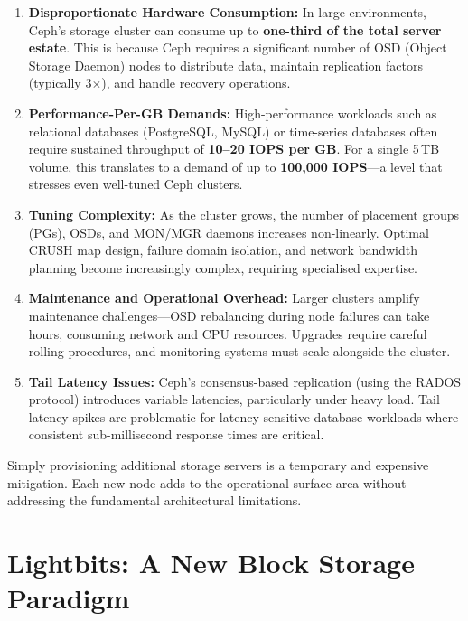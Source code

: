 \documentclass[12pt,a4paper,oneside]{report}
\begin{document}
\begin{enumerate}[label=\arabic*.]
    \item \textbf{Disproportionate Hardware Consumption:} In large environments, Ceph's storage cluster can consume up to \textbf{one-third of the total server estate}. This is because Ceph requires a significant number of OSD (Object Storage Daemon) nodes to distribute data, maintain replication factors (typically 3$\times$), and handle recovery operations.

    \item \textbf{Performance-Per-GB Demands:} High-performance workloads such as relational databases (PostgreSQL, MySQL) or time-series databases often require sustained throughput of \textbf{10–20 IOPS per GB}. For a single 5\,TB volume, this translates to a demand of up to \textbf{100,000 IOPS}—a level that stresses even well-tuned Ceph clusters.

    \item \textbf{Tuning Complexity:} As the cluster grows, the number of placement groups (PGs), OSDs, and MON/MGR daemons increases non-linearly. Optimal CRUSH map design, failure domain isolation, and network bandwidth planning become increasingly complex, requiring specialised expertise.

    \item \textbf{Maintenance and Operational Overhead:} Larger clusters amplify maintenance challenges—OSD rebalancing during node failures can take hours, consuming network and CPU resources. Upgrades require careful rolling procedures, and monitoring systems must scale alongside the cluster.

    \item \textbf{Tail Latency Issues:} Ceph's consensus-based replication (using the RADOS protocol) introduces variable latencies, particularly under heavy load. Tail latency spikes are problematic for latency-sensitive database workloads where consistent sub-millisecond response times are critical.
\end{enumerate}

Simply provisioning additional storage servers is a temporary and expensive mitigation. Each new node adds to the operational surface area without addressing the fundamental architectural limitations.

\section{Lightbits: A New Block Storage Paradigm}
\end{document}
